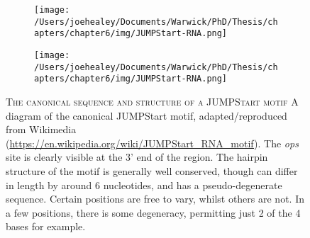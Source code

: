 \begin{figure}[h]
\centering
  \begin{subfigure}{0.49\textwidth}
    \texttt{[image: /Users/joehealey/Documents/Warwick/PhD/Thesis/chapters/chapter6/img/JUMPStart-RNA.png]}
  \end{subfigure}
  \begin{subfigure}{0.49\textwidth}
    \texttt{[image: /Users/joehealey/Documents/Warwick/PhD/Thesis/chapters/chapter6/img/JUMPStart-RNA.png]}
  \end{subfigure}
  
    \captionsetup{singlelinecheck=off, justification=justified, font=footnotesize, aboveskip=10pt}
    \caption[The canoncial semi-degenerate JUMPStart motif]{\textsc{\normalsize The canonical sequence and structure of a JUMPStart motif} \vspace{0.1cm} \newline A diagram of the canonical JUMPStart motif, adapted/reproduced from Wikimedia (\url{https://en.wikipedia.org/wiki/JUMPStart_RNA_motif}). The \emph{ops} site is clearly visible at the 3' end of the region. The hairpin structure of the motif is generally well conserved, though can differ in length by around 6 nucleotides, and has a pseudo-degenerate sequence. Certain positions are free to vary, whilst others are not. In a few positions, there is some degeneracy, permitting just 2 of the 4 bases for example.}
\label{canonicaljs}
\end{figure}


%
%
%
%
%
%
%



